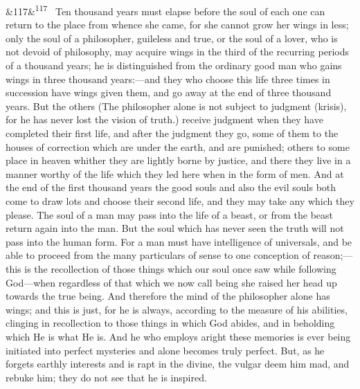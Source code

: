 \documentclass[12pt]{article}
\newcommand{\para}[1][]{\par\noindent\ifx&#1&\else\textsuperscript{\footnotesize #1}~\fi}
\begin{document}
\para[117] Ten thousand years must elapse before the soul of each one can return to the place from whence she came, for she cannot grow her wings in less; only the soul of a philosopher, guileless and true, or the soul of a lover, who is not devoid of philosophy, may acquire wings in the third of the recurring periods of a thousand years; he is distinguished from the ordinary good man who gains wings in three thousand years:---and they who choose this life three times in succession have wings given them, and go away at the end of three thousand years. But the others (The philosopher alone is not subject to judgment (krisis), for he has never lost the vision of truth.) receive judgment when they have completed their first life, and after the judgment they go, some of them to the houses of correction which are under the earth, and are punished; others to some place in heaven whither they are lightly borne by justice, and there they live in a manner worthy of the life which they led here when in the form of men. And at the end of the first thousand years the good souls and also the evil souls both come to draw lots and choose their second life, and they may take any which they please. The soul of a man may pass into the life of a beast, or from the beast return again into the man. But the soul which has never seen the truth will not pass into the human form. For a man must have intelligence of universals, and be able to proceed from the many particulars of sense to one conception of reason;---this is the recollection of those things which our soul once saw while following God---when regardless of that which we now call being she raised her head up towards the true being. And therefore the mind of the philosopher alone has wings; and this is just, for he is always, according to the measure of his abilities, clinging in recollection to those things in which God abides, and in beholding which He is what He is. And he who employs aright these memories is ever being initiated into perfect mysteries and alone becomes truly perfect. But, as he forgets earthly interests and is rapt in the divine, the vulgar deem him mad, and rebuke him; they do not see that he is inspired.
\end{document}
